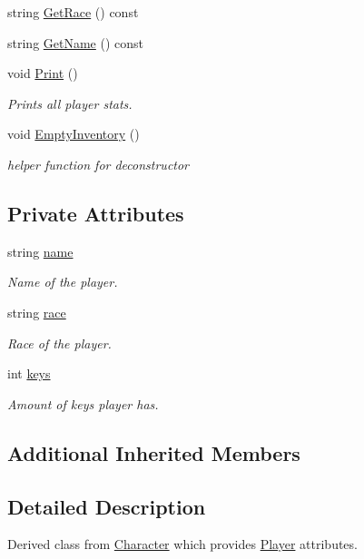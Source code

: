 \begin{DoxyCompactItemize}
\item 
string \hyperlink{classPlayer_a5b008e9aa1ebe834f022d4e3cfa958c6}{Get\-Race} () const 
\item 
string \hyperlink{classPlayer_a5645669a3ad13ea99d194b85601e79ec}{Get\-Name} () const 
\item 
void \hyperlink{classPlayer_a526ecf9587b1a537e48b5fca4d2997eb}{Print} ()
\begin{DoxyCompactList}\small\item\em Prints all player stats. \end{DoxyCompactList}\item 
void \hyperlink{classPlayer_af7b9e152fb61d8b4b0bbaf94a68a859c}{Empty\-Inventory} ()
\begin{DoxyCompactList}\small\item\em helper function for deconstructor \end{DoxyCompactList}\end{DoxyCompactItemize}
\subsection*{Private Attributes}
\begin{DoxyCompactItemize}
\item 
string \hyperlink{classPlayer_acf0355128a99ee20ad9931b760fb2de1}{name}
\begin{DoxyCompactList}\small\item\em Name of the player. \end{DoxyCompactList}\item 
string \hyperlink{classPlayer_a5130cb6c4233cd7ad1212af0d1790e58}{race}
\begin{DoxyCompactList}\small\item\em Race of the player. \end{DoxyCompactList}\item 
int \hyperlink{classPlayer_ac46baa685ca2a266178f03b9e9877e65}{keys}
\begin{DoxyCompactList}\small\item\em Amount of keys player has. \end{DoxyCompactList}\end{DoxyCompactItemize}
\subsection*{Additional Inherited Members}


\subsection{Detailed Description}
Derived class from \hyperlink{classCharacter}{Character} which provides \hyperlink{classPlayer}{Player} attributes. 

